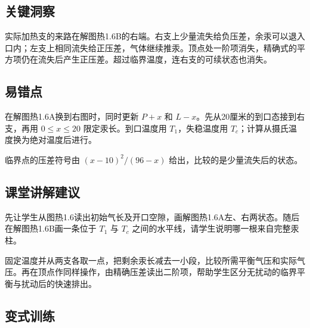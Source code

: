 \documentclass[UTF8,fontset=fandol,a4paper,11pt]{ctexart}
\begin{document}


\subsection*{关键洞察}

实际加热支的来路在解图热1.6B的右端。右支上少量流失给负压差，余汞可以退入口内；左支上相同流失给正压差，气体继续推汞。顶点处一阶项消失，精确式的平方项仍在流失后产生正压差。超过临界温度，连右支的可续状态也消失。



\subsection*{易错点}

在解图热1.6A换到右图时，同时更新 $P+x$ 和 $L-x$。先从20厘米的到口态接到右支，再用 $0\le x\le20$ 限定汞长。到口温度用 $T_1$，失稳温度用 $T_c$；计算从摄氏温度换为绝对温度后进行。

临界点的压差符号由 $(x-10)^2/(96-x)$ 给出，比较的是少量流失后的状态。



\subsection*{课堂讲解建议}

先让学生从图热1.6读出初始气长及开口空隙，画解图热1.6A左、右两状态。随后在解图热1.6B画一条位于 $T_1$ 与 $T_c$ 之间的水平线，请学生说明哪一根来自完整汞柱。

固定温度并从两支各取一点，把剩余汞长减去一小段，比较所需平衡气压和实际气压。再在顶点作同样操作，由精确压差读出二阶项，帮助学生区分无扰动的临界平衡与扰动后的快速排出。




\subsection*{变式训练}
\end{document}

